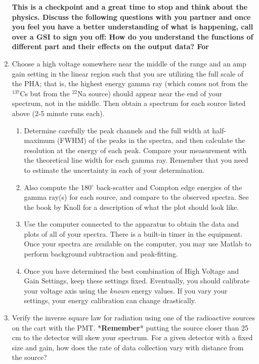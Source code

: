 \documentclass{../lab}
\begin{document}
\begin{enumerate}
    \textbf{This is a checkpoint and a great time to stop and think about the physics. Discuss the following questions with you partner and once you feel you have a better understanding of what is happening, call over a GSI to sign you off: How do you understand the functions of different part and their effects on the output data? For }

    \item Choose a high voltage somewhere near the middle of the range and an amp gain setting in the linear region such that you are utilizing the full scale of the PHA; that is, the highest energy gamma ray (which comes not from the $^{137}$Cs but from the $^{22}$Na source) should appear near the end of your spectrum, not in the middle. Then obtain a spectrum for each source listed above (2-5 minute runs each).
    \begin{enumerate}
        \item Determine carefully the peak channels and the full width at half-maximum (FWHM) of the peaks in the spectra, and then calculate the resolution at the energy of each peak. Compare your measurement with the theoretical line width for each gamma ray. Remember that you need to estimate the uncertainty in each of your determination.

        \item Also compute the 180$^\circ$ back-scatter and Compton edge energies of the gamma ray(s) for each source, and compare to the observed spectra. See the book by Knoll for a description of what the plot should look like.

        \item Use the computer connected to the apparatus to obtain the data and plots of all of your spectra. There is a built-in timer in the equipment. Once your spectra are available on the computer, you may use Matlab to perform background subtraction and peak-fitting.

        \item Once you have determined the best combination of High Voltage and Gain Settings, keep these settings fixed. Eventually, you should calibrate your voltage axis using the \emph{known} energy values. If you vary your settings, your energy calibration can change drastically.

    \end{enumerate}

    \item Verify the inverse square law for radiation using one of the radioactive sources on the cart with the PMT. *\textbf{Remember}* putting the source closer than 25 cm to the detector will skew your spectrum. For a given detector with a fixed size and gain, how does the rate of data collection vary with distance from the source?


\end{enumerate}
\end{document}
